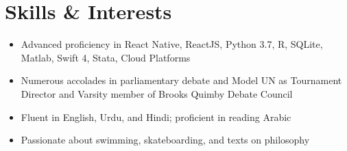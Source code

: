\documentclass[letterpaper,11pt]{article}
\newcommand{\resumeItem}[2]{
  \item\small{
    \textbf{#1}{#2 \vspace{-2pt}}
  }
}
\newcommand{\resumeSubItem}[2]{\resumeItem{#1}{#2}\vspace{-4pt}}
\newcommand{\resumeSubHeadingListStart}{\begin{itemize}[leftmargin=*]}
\newcommand{\resumeSubHeadingListEnd}{\end{itemize}}
\begin{document}
\section{Skills \& Interests}
  \resumeSubHeadingListStart
    \resumeSubItem{}
      {Advanced proficiency in React Native, ReactJS, Python 3.7, R, SQLite, Matlab, Swift 4, Stata, Cloud Platforms}
    \resumeSubItem{}{Numerous accolades in parliamentary debate and Model UN as Tournament Director and Varsity member of Brooks Quimby Debate Council}
    \resumeSubItem{}
      {Fluent in English, Urdu, and Hindi; proficient in reading Arabic}
    \resumeSubItem{}
      {Passionate about swimming, skateboarding, and texts on philosophy}
  \resumeSubHeadingListEnd

%


\end{document}
